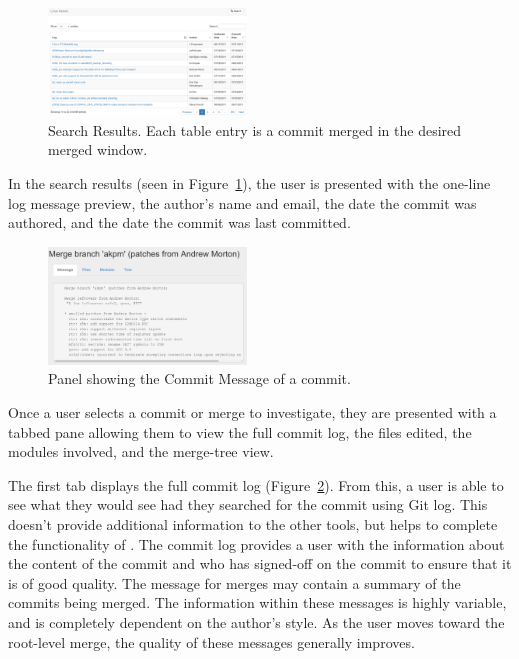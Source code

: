 \documentclass[draft]{IEEEtran}
\begin{document}
\begin{figure}
        \centering
        \includegraphics[width=0.47\textwidth]{figures/search_results_2.png}
        \caption{Search Results. Each table entry is a commit merged in the desired
                merged window.}
        \label{fig:results}
\end{figure}

In the search results (seen in Figure~\ref{fig:results}), the user is
presented with the one-line log message preview, the author's name and
email, the date the commit was authored, and the date the commit was
last committed.

\begin{figure}
        \centering
        \includegraphics[width=0.47\textwidth]{figures/log_view.png}
        \caption{Panel showing the Commit Message of a commit.}
        \label{fig:message}
\end{figure}

Once a user selects a commit or merge to investigate, they are presented
with a tabbed pane allowing them to view the full commit log, the files
edited, the modules involved, and the merge-tree view.

The first tab displays the full commit log (Figure~\ref{fig:message}).
From this, a user is able to see what they would see had they searched
for the commit using Git log. This doesn't provide additional
information to the other tools, but helps to complete the functionality
of \tool. The commit log provides a user with the information about the
content of the commit and who has signed-off on the commit to ensure
that it is of good quality. The message for merges may contain a summary
of the commits being merged.  The information within these messages is
highly variable, and is completely dependent on the author's style. As
the user moves toward the root-level merge, the quality of these
messages generally improves.
\end{document}
